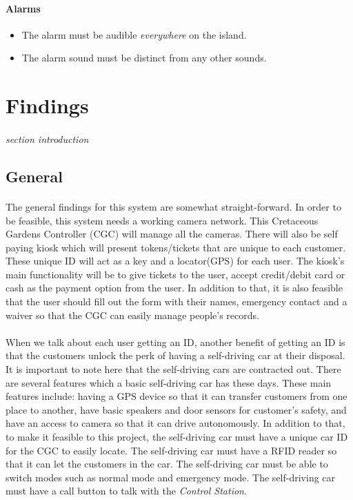\documentclass[12pt]{article}
\begin{document}
    \paragraph{Alarms}
    \begin{itemize}
        \item[] The alarm must be audible \textit{everywhere} on the island.
        \item[] The alarm sound must be distinct from any other sounds.
    \end{itemize}
            
\section{Findings}
\paragraph{} \textit{section introduction}
    \subsection{General}
    \paragraph{} The general findings for this system are somewhat straight-forward. 
    In order to be feasible, this system needs a working camera network. This Cretaceous
    Gardens Controller (CGC) will manage all the cameras. There will also be self paying 
    kiosk which will present tokens/tickets that are unique to each customer. These unique 
    ID will act as a key and a locator(GPS) for each user. The kiosk's main functionality 
    will be to give tickets to the user, accept credit/debit card or cash as the payment 
    option from the user. In addition to that, it is also feasible that the user should 
    fill out the form with their names, emergency contact and a waiver so that the CGC 
    can easily manage people's records. 

    \paragraph{} When we talk about each user getting an ID, another benefit of getting an 
    ID is that the customers unlock the perk of having a self-driving car at their disposal. 
    It is important to note here that the self-driving cars are contracted out. There are 
    several features which a basic self-driving car has these days. These main features 
    include: having a GPS device so that it can transfer customers from one place to another, 
    have basic speakers and door sensors for customer's safety, and have an access to camera 
    so that it can drive autonomously. In addition to that, to make it feasible to this project,
    the self-driving car must have a unique car ID for the CGC to easily locate. The self-driving 
    car must have a RFID reader so that it can let the customers in the car. The self-driving car 
    must be able to switch modes such as normal mode and emergency mode. The self-driving car must
     have a call button to talk with the \textit{Control Station}.
    
\end{document}
